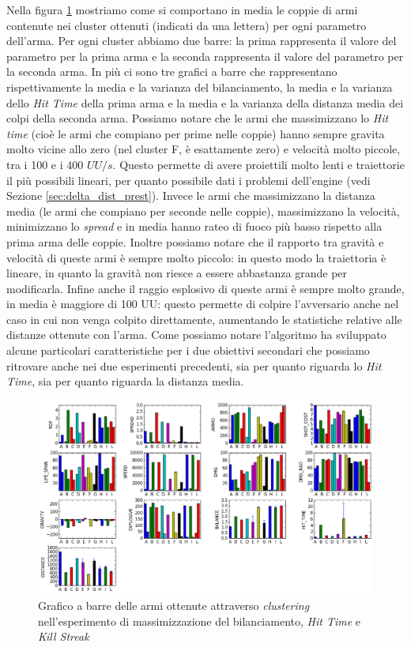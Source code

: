 \documentclass[12pt, italian]{toptesi}
\begin{document}
Nella figura \ref{fig:bar_delta_dist} mostriamo come si comportano in media le coppie di armi contenute nei cluster ottenuti (indicati da una lettera) per ogni parametro dell'arma. Per ogni cluster abbiamo due barre: la prima rappresenta il valore del parametro per la prima arma e la seconda rappresenta il valore del parametro per la seconda arma. In più ci sono tre grafici a barre che rappresentano rispettivamente la media e la varianza del bilanciamento, la media e la varianza dello \emph{Hit Time} della prima arma e la media e la varianza della distanza media dei colpi della seconda arma.
Possiamo notare che le armi che massimizzano lo \emph{Hit time} (cioè le armi che compiano per prime nelle coppie) hanno sempre gravita molto vicine allo zero (nel cluster F, è esattamente zero) e velocità molto piccole, tra i 100 e i 400 $UU/s$. Questo permette di avere proiettili molto lenti e traiettorie il più possibili lineari, per quanto possibile dati i problemi dell'engine (vedi Sezione \ref{sec:delta_dist_prest}).
Invece le armi che massimizzano la distanza media (le armi che compiano per seconde nelle coppie), massimizzano la velocità, minimizzano lo \emph{spread} e in media hanno rateo di fuoco più basso rispetto alla prima arma delle coppie.
Inoltre possiamo notare che il rapporto tra gravità e velocità di queste armi è sempre molto piccolo: in questo modo la traiettoria è lineare, in quanto la gravità non riesce a essere abbastanza grande per modificarla.
Infine anche il raggio esplosivo di queste armi è sempre molto grande, in media è maggiore di 100 UU: questo permette di colpire l'avversario anche nel caso in cui non venga colpito direttamente, aumentando le statistiche relative alle distanze ottenute con l'arma.
Come possiamo notare l'algoritmo ha sviluppato alcune particolari caratteristiche per i due obiettivi secondari che possiamo ritrovare anche nei due esperimenti precedenti, sia per quanto riguarda lo \emph{Hit Time}, sia per quanto riguarda la distanza media.

\begin{figure}[tp]
\centering
\includegraphics[width=1.2\textwidth, angle=90]{bar_delta_dist}
\caption{Grafico a barre delle armi ottenute attraverso \emph{clustering} nell'esperimento di massimizzazione del bilanciamento, \emph{Hit Time} e \emph{Kill Streak}}
\label{fig:bar_delta_dist}
\end{figure}
\end{document}
